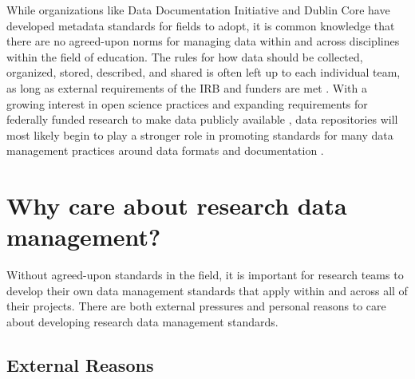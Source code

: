 \documentclass[
]{book}
\begin{document}
While organizations like Data Documentation Initiative and Dublin Core have developed metadata standards for fields to adopt, it is common knowledge that there are no agreed-upon norms for managing data within and across disciplines within the field of education. The rules for how data should be collected, organized, stored, described, and shared is often left up to each individual team, as long as external requirements of the IRB and funders are met \autocite{tenopir_data_2016-1}. With a growing interest in open science practices and expanding requirements for federally funded research to make data publicly available \autocite{office_of_science_and_technology_policy_ostp_2022}, data repositories will most likely begin to play a stronger role in promoting standards for many data management practices around data formats and documentation \autocite{borghi_promoting_2022}.

\hypertarget{why-care-about-research-data-management}{%
\section{Why care about research data management?}\label{why-care-about-research-data-management}}

Without agreed-upon standards in the field, it is important for research teams to develop their own data management standards that apply within and across all of their projects. There are both external pressures and personal reasons to care about developing research data management standards.

\hypertarget{external-reasons}{%
\subsection{External Reasons}\label{external-reasons}}
\end{document}
